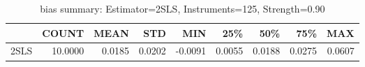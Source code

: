 \begin{table}[ht]
\centering
\caption{bias summary: Estimator=2SLS, Instruments=125, Strength=0.90}
\begin{tabular}{lrrrrrrrr}
\toprule
 & COUNT & MEAN & STD & MIN & 25\% & 50\% & 75\% & MAX \\
\midrule
2SLS & 10.0000 & 0.0185 & 0.0202 & -0.0091 & 0.0055 & 0.0188 & 0.0275 & 0.0607 \\
\bottomrule
\end{tabular}
\end{table}

